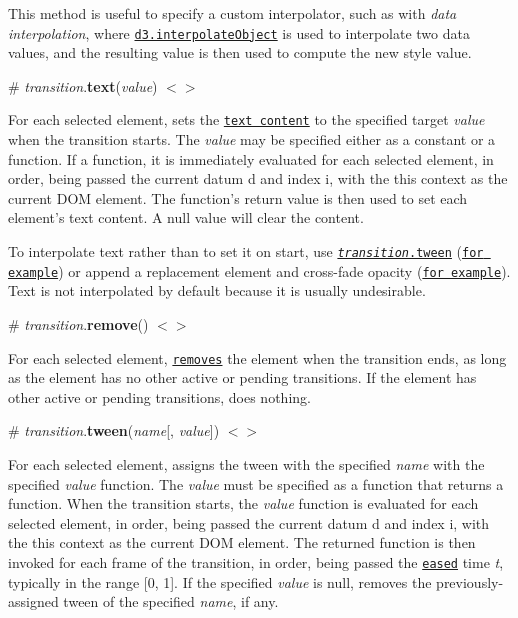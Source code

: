 This method is useful to specify a custom interpolator, such as with {\itshape data interpolation}, where \href{https://github.com/d3/d3-interpolate#interpolateObject}{\tt d3.\+interpolate\+Object} is used to interpolate two data values, and the resulting value is then used to compute the new style value.

\label{_transition_text}%
\# {\itshape transition}.{\bfseries text}({\itshape value}) \href{https://github.com/d3/d3-transition/blob/master/src/transition/text.js}{\tt $<$$>$}

For each selected element, sets the \href{http://www.w3.org/TR/DOM-Level-3-Core/core.html#Node3-textContent}{\tt text content} to the specified target {\itshape value} when the transition starts. The {\itshape value} may be specified either as a constant or a function. If a function, it is immediately evaluated for each selected element, in order, being passed the current datum {\ttfamily d} and index {\ttfamily i}, with the {\ttfamily this} context as the current D\+OM element. The function’s return value is then used to set each element’s text content. A null value will clear the content.

To interpolate text rather than to set it on start, use \href{#transition_tween}{\tt {\itshape transition}.tween} (\href{http://bl.ocks.org/mbostock/7004f92cac972edef365}{\tt for example}) or append a replacement element and cross-\/fade opacity (\href{http://bl.ocks.org/mbostock/f7dcecb19c4af317e464}{\tt for example}). Text is not interpolated by default because it is usually undesirable.

\label{_transition_remove}%
\# {\itshape transition}.{\bfseries remove}() \href{https://github.com/d3/d3-transition/blob/master/src/transition/remove.js}{\tt $<$$>$}

For each selected element, \href{https://github.com/d3/d3-selection#selection_remove}{\tt removes} the element when the transition ends, as long as the element has no other active or pending transitions. If the element has other active or pending transitions, does nothing.

\label{_transition_tween}%
\# {\itshape transition}.{\bfseries tween}({\itshape name}\mbox{[}, {\itshape value}\mbox{]}) \href{https://github.com/d3/d3-transition/blob/master/src/transition/tween.js}{\tt $<$$>$}

For each selected element, assigns the tween with the specified {\itshape name} with the specified {\itshape value} function. The {\itshape value} must be specified as a function that returns a function. When the transition starts, the {\itshape value} function is evaluated for each selected element, in order, being passed the current datum {\ttfamily d} and index {\ttfamily i}, with the {\ttfamily this} context as the current D\+OM element. The returned function is then invoked for each frame of the transition, in order, being passed the \href{#transition_ease}{\tt eased} time {\itshape t}, typically in the range \mbox{[}0, 1\mbox{]}. If the specified {\itshape value} is null, removes the previously-\/assigned tween of the specified {\itshape name}, if any.

